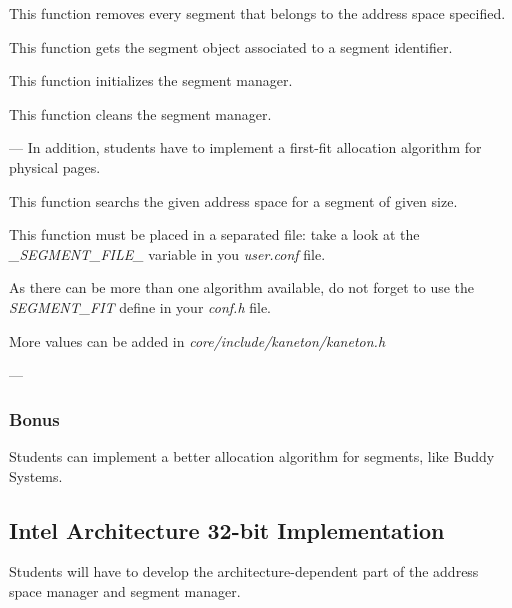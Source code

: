 	  {This function removes every segment that belongs to the
	    address space specified.}

	  {This function gets the segment object associated to a segment
	    identifier.}

	  {This function initializes the segment manager.}

	  {This function cleans the segment manager.}

---
In addition, students have to implement a first-fit allocation
algorithm for physical pages.

	  {This function searchs the given address space for a segment
	    of given size.

	    This function must be placed in a separated file: take a look
	    at the \textit{\_SEGMENT\_FILE\_} variable in you
	    \textit{user.conf} file.

	    As there can be more than one algorithm available, do not forget
	    to use the \textit{SEGMENT\_FIT} define in your \textit{conf.h}
	    file.

	    More values can be added in
	    \textit{core/include/kaneton/kaneton.h}}

---

%
%

\subsubsection{Bonus}

Students can implement a better allocation algorithm for segments,
like Buddy Systems.

%
%

\subsection{Intel Architecture 32-bit Implementation}

Students will have to develop the architecture-dependent part of the
address space manager and segment manager.

